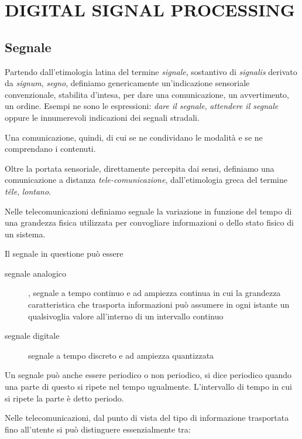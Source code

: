 
\chapter{DIGITAL SIGNAL PROCESSING}

\section{Segnale}

Partendo dall'etimologia latina del termine \emph{signale}, sostantivo di
\emph{signalis} derivato da \emph{signum}, \emph{segno}, definiamo genericamente
un'indicazione sensoriale convenzionale, stabilita d'intesa, per dare una comunicazione,
un avvertimento, un ordine. Esempi ne sono le espressioni: \emph{dare il segnale},
\emph{attendere il segnale} oppure le innumerevoli indicazioni dei segnali stradali.

Una comunicazione, quindi, di cui se ne condividano le modalità e se ne
comprendano i contenuti.

Oltre la portata sensoriale, direttamente percepita dai sensi, definiamo
una comunicazione a distanza \emph{tele-comunicazione}, dall'etimologia greca
del termine \emph{têle}, \emph{lontano}.

Nelle telecomunicazioni definiamo segnale la variazione in funzione del tempo
di una grandezza fisica utilizzata per convogliare informazioni o dello stato
fisico di un sistema.

Il segnale in questione può essere

\begin{description}
  \item[segnale analogico], segnale a tempo continuo e ad ampiezza continua in
       cui la grandezza caratteristica che trasporta
       informazioni può assumere in ogni istante un qualsivoglia valore
       all'interno di un intervallo continuo
  \item[segnale digitale] segnale a tempo discreto e ad ampiezza quantizzata
\end{description}

Un segnale può anche essere periodico o non periodico, si dice periodico quando
una parte di questo si ripete nel tempo ugualmente. L'intervallo di tempo in cui
si ripete la parte è detto periodo.

Nelle telecomunicazioni, dal punto di vista del tipo di informazione trasportata
fino all'utente si può distinguere essenzialmente tra:

